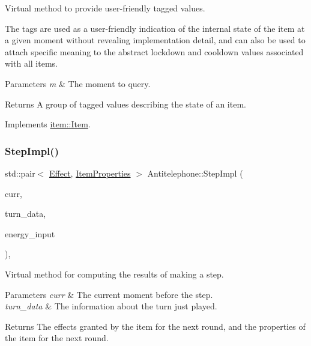 Virtual method to provide user-\/friendly tagged values. 

The tags are used as a user-\/friendly indication of the internal state of the item at a given moment without revealing implementation detail, and can also be used to attach specific meaning to the abstract lockdown and cooldown values associated with all items. 
\begin{DoxyParams}{Parameters}
{\em m} & The moment to query. \\
\hline
\end{DoxyParams}
\begin{DoxyReturn}{Returns}
A group of tagged values describing the state of an item. 
\end{DoxyReturn}


Implements \hyperlink{classitem_1_1_item_acc560ac68be4f5781cd90cddfd602942}{item\+::\+Item}.

\mbox{\label{classitem_1_1_antitelephone_aa59b4569bac948f37fd15dbea234503f}} 
\subsubsection{\texorpdfstring{Step\+Impl()}{StepImpl()}}
{\footnotesize\ttfamily std\+::pair$<$ \hyperlink{classitem_1_1_effect}{Effect}, \hyperlink{classitem_1_1_item_properties}{Item\+Properties} $>$ Antitelephone\+::\+Step\+Impl (\begin{DoxyParamCaption}\item[{\hyperlink{classtimeplane_1_1_moment}{Moment}}]{curr,  }\item[{\hyperlink{classroundinfo_1_1_round_info_view}{Round\+Info\+View} const \&}]{turn\+\_\+data,  }\item[{int}]{energy\+\_\+input }\end{DoxyParamCaption})\hspace{0.3cm}{\ttfamily [protected]}, {\ttfamily [virtual]}}



Virtual method for computing the results of making a step. 


\begin{DoxyParams}{Parameters}
{\em curr} & The current moment before the step. \\
\hline
{\em turn\+\_\+data} & The information about the turn just played. \\
\hline
\end{DoxyParams}
\begin{DoxyReturn}{Returns}
The effects granted by the item for the next round, and the properties of the item for the next round. 
\end{DoxyReturn}


